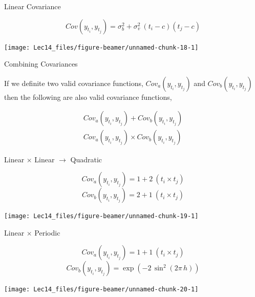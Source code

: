 \documentclass[11pt,ignorenonframetext,]{beamer}
\begin{document}
\begin{frame}[t]{Linear Covariance}
\protect\hypertarget{linear-covariance}{}

\vspace{-5mm}

\[ Cov(y_{t_i}, y_{t_j}) = \sigma^2_b + \sigma^2_v~(t_i-c)(t_j-c)\]

\begin{center}\texttt{[image: Lec14\_files/figure-beamer/unnamed-chunk-18-1]} \end{center}

\end{frame}

\begin{frame}[t]{Combining Covariances}
\protect\hypertarget{combining-covariances}{}

If we definite two valid covariance functions,
\(Cov_a(y_{t_i}, y_{t_j})\) and \(Cov_b(y_{t_i}, y_{t_j})\) then the
following are also valid covariance functions,

\[
\begin{aligned}
Cov_a(y_{t_i}, y_{t_j}) + Cov_b(y_{t_i}, y_{t_j}) \\
Cov_a(y_{t_i}, y_{t_j}) \times Cov_b(y_{t_i}, y_{t_j})
\end{aligned}
\]

\end{frame}

\begin{frame}[t]{Linear \(\times\) Linear \(\to\) Quadratic}
\protect\hypertarget{linear-times-linear-to-quadratic}{}

\vspace{-5mm}

\[ Cov_a(y_{t_i}, y_{t_j}) = 1 + 2~(t_i \times t_j) \]
\[ Cov_b(y_{t_i}, y_{t_j}) = 2 + 1~(t_i \times t_j) \]

\begin{center}\texttt{[image: Lec14\_files/figure-beamer/unnamed-chunk-19-1]} \end{center}

\end{frame}

\begin{frame}[t]{Linear \(\times\) Periodic}
\protect\hypertarget{linear-times-periodic}{}

\vspace{-5mm}

\[ Cov_a(y_{t_i}, y_{t_j}) = 1 + 1~(t_i \times t_j) \]
\[ Cov_b(y_{t_i}, y_{t_j}) = \exp\left(-2\, \sin^2\left(2\pi\,h\right)\right) \]

\begin{center}\texttt{[image: Lec14\_files/figure-beamer/unnamed-chunk-20-1]} \end{center}

\end{frame}
\end{document}
